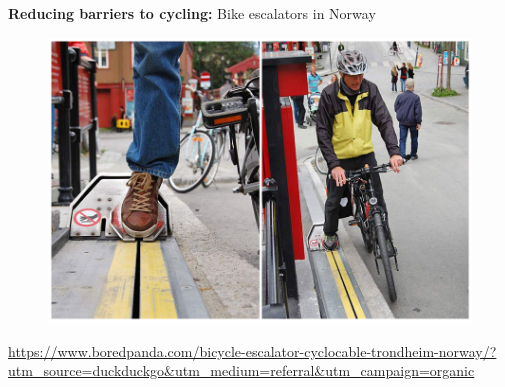 \documentclass[aspectratio=169]{beamer}
\begin{document}
\begin{frame}
	
	\textbf{Reducing barriers to cycling:} Bike escalators in Norway
	
	\begin{figure}
		\centering
		\includegraphics[width=0.85\linewidth]{images/norway_bike_escalator.png}
	\end{figure}
	
	\tiny\url{https://www.boredpanda.com/bicycle-escalator-cyclocable-trondheim-norway/?utm_source=duckduckgo&utm_medium=referral&utm_campaign=organic}
	
\end{frame}





\begin{frame}
	
	
	
\end{frame}
\end{document}

